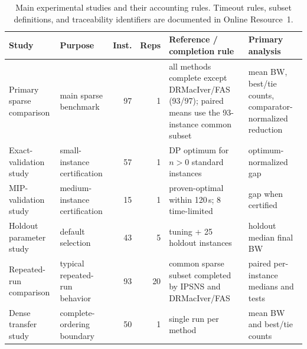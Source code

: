 \begin{table}[t]
\centering
\footnotesize
\caption{Main experimental studies and their accounting rules. Timeout rules, subset definitions, and traceability identifiers are documented in Online Resource~1.}
\label{tab:comparison-accounting}
\begin{tabularx}{\linewidth}{@{}>{\raggedright\arraybackslash}p{2.4cm}>{\raggedright\arraybackslash}p{2.5cm}r r>{\raggedright\arraybackslash}X>{\raggedright\arraybackslash}p{2.2cm}@{}}
\toprule
Study & Purpose & Inst. & Reps & Reference / completion rule & Primary analysis \\
\midrule
Primary sparse comparison & main sparse benchmark & 97 & 1 & all methods complete except DRMacIver/FAS (93/97); paired means use the 93-instance common subset & mean BW, best/tie counts, comparator-normalized reduction \\
Exact-validation study & small-instance certification & 57 & 1 & DP optimum for \(n>0\) standard instances & optimum-normalized gap \\
MIP-validation study & medium-instance certification & 15 & 1 & 7 proven-optimal within 120\,s; 8 time-limited & gap when certified \\
Holdout parameter study & default selection & 43 & 5 & 18 tuning + 25 holdout instances & holdout median final BW \\
Repeated-run comparison & typical repeated-run behavior & 93 & 20 & common sparse subset completed by IPSNS and DRMacIver/FAS & paired per-instance medians and tests \\
Dense transfer study & complete-ordering boundary & 50 & 1 & single run per method & mean BW and best/tie counts \\
\bottomrule
\end{tabularx}
\end{table}
